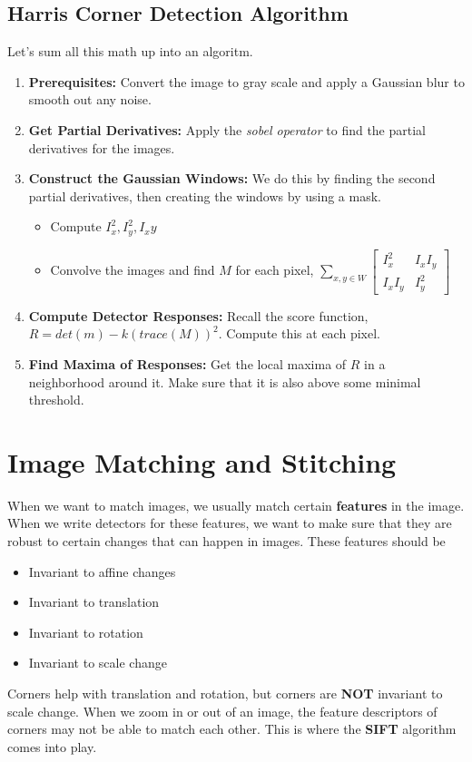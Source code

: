 \documentclass{article}
\begin{document}
\subsection{Harris Corner Detection Algorithm}
Let's sum all this math up into an algoritm. 
\begin{enumerate}
    \item \textbf{Prerequisites:} Convert the image to gray scale and apply a Gaussian blur to smooth out any noise.
    \item \textbf{Get Partial Derivatives:} Apply the \textit{sobel operator} to find the partial derivatives for the images.
    \item \textbf{Construct the Gaussian Windows:} We do this by finding the second partial derivatives, then creating the windows by using a mask.
    \begin{itemize}
        \item Compute $I^2_x,I^2_y, I_xy$
        \item Convolve the images and find $M$ for each pixel, $ \sum_{x,y \in W}\begin{bmatrix}
        I_x^2 & I_xI_y \\
        I_xI_y & I_y^2 
        \end{bmatrix}$
    \end{itemize}
    \item \textbf{Compute Detector Responses:} Recall the score function, $R = det(m) - k(trace(M))^2$. Compute this at each pixel.
    \item \textbf{Find Maxima of Responses:} Get the local maxima of $R$ in a neighborhood around it. Make sure that it is also above some minimal threshold. 
\end{enumerate}
\section{Image Matching and Stitching}
When we want to match images, we usually match certain \textbf{features} in the image. When we write detectors for these features, we want to make sure that they are robust to certain changes that can happen in images. These features should be 
\begin{itemize}
    \item Invariant to affine changes
    \item Invariant to translation
    \item Invariant to rotation
    \item Invariant to scale change
\end{itemize}
Corners help with translation and rotation, but corners are \textbf{NOT} invariant to scale change. When we zoom in or out of an image, the feature descriptors of corners may not be able to match each other. This is where the \textbf{SIFT} algorithm comes into play.
\end{document}
